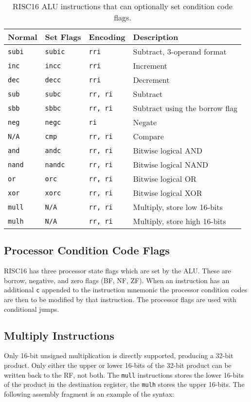 \begin{table}[h!]
\begin{center}
\begin{tabular}{l l l l}
\multicolumn{1}{c}{Normal} & \multicolumn{1}{c}{Set Flags} &
	Encoding & Description \\
	\hline
	\tt subi & \tt subic&	\tt rri	& Subtract, 3-operand format	\\
	\tt inc & \tt incc	&	\tt rri	& Increment	\\
	\tt dec & \tt decc	&	\tt rri	& Decrement	\\
	\tt sub & \tt subc	&	\tt rr, ri	& Subtract	\\
	\tt sbb & \tt sbbc	&	\tt rr, ri	& Subtract using the borrow flag	\\
	\tt neg & \tt negc	&	\tt ri	& Negate	\\
	\tt N/A	& \tt cmp	&	\tt rr, ri	& Compare	\\
	\tt and & \tt andc	&	\tt rr, ri	& Bitwise logical AND	\\
	\tt nand & \tt nandc&	\tt rr, ri	& Bitwise logical NAND	\\
	\tt or & \tt orc	&	\tt rr, ri	& Bitwise logical OR	\\
	\tt xor & \tt xorc	&	\tt rr, ri	& Bitwise logical XOR	\\
	\tt mull & \tt N/A	&	\tt rr, ri	& Multiply, store low 16-bits	\\
	\tt mulh & \tt N/A	&	\tt rr, ri	& Multiply, store high 16-bits	\\
	
\end{tabular}
\end{center}
\caption[ALU instructions that can optionally set condition codes]{RISC16 ALU
instructions that can optionally set condition code flags.}
\label{RISCPROG_ALU}
\end{table}


\subsection{Processor Condition Code Flags}
RISC16 has three processor state flags which are set by the ALU. These are
borrow, negative, and zero flags (BF, NF, ZF). When an instruction has an
additional \texttt{c} appended to the instruction mnemonic the processor
condition codes are then to be modified by that instruction. The processor flags
are used with conditional jumps.


\subsection{Multiply Instructions}
Only 16-bit unsigned multiplication is directly supported, producing a 32-bit
product. Only either the upper or lower 16-bits of the 32-bit product can be
written back to the RF, not both. The \texttt{mull} instructions stores the lower
16-bits of the product in the destination register, the \texttt{mulh} stores the
upper 16-bits. The following assembly fragment is an example of the syntax:

